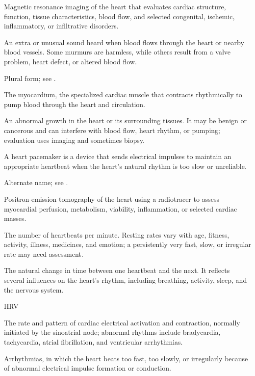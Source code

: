  Magnetic resonance imaging of the heart that evaluates cardiac structure, function, tissue characteristics, blood flow, and selected congenital, ischemic, inflammatory, or infiltrative disorders.

 An extra or unusual sound heard when blood flows through the heart or nearby blood vessels. Some murmurs are harmless, while others result from a valve problem, heart defect, or altered blood flow.

 Plural form; see .

 The myocardium, the specialized cardiac muscle that contracts rhythmically to pump blood through the heart and circulation.

 An abnormal growth in the heart or its surrounding tissues. It may be benign or cancerous and can interfere with blood flow, heart rhythm, or pumping; evaluation uses imaging and sometimes biopsy.

 A heart pacemaker is a device that sends electrical impulses to maintain an appropriate heartbeat when the heart's natural rhythm is too slow or unreliable.

 Alternate name; see .

 Positron-emission tomography of the heart using a radiotracer to assess myocardial perfusion, metabolism, viability, inflammation, or selected cardiac masses.

 The number of heartbeats per minute. Resting rates vary with age, fitness, activity, illness, medicines, and emotion; a persistently very fast, slow, or irregular rate may need assessment.

 The natural change in time between one heartbeat and the next. It reflects several influences on the heart’s rhythm, including breathing, activity, sleep, and the nervous system.

\synonyms
HRV

 The rate and pattern of cardiac electrical activation and contraction, normally initiated by the sinoatrial node; abnormal rhythms include bradycardia, tachycardia, atrial fibrillation, and ventricular arrhythmias.

 Arrhythmias, in which the heart beats too fast, too slowly, or irregularly because of abnormal electrical impulse formation or conduction.

